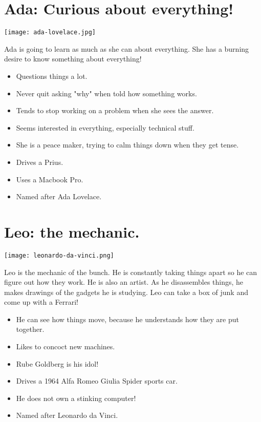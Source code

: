 \section{Ada:  Curious about everything!}
\texttt{[image: ada-lovelace.jpg]}

Ada is going to learn as much as she can about everything. She has a burning
desire to know something about everything!

\begin{itemize}
    \item{Questions things a lot.}
    \item{Never quit asking "why" when told how something works.}
    \item{Tends to stop working on a problem when she sees the answer.}
    \item{Seems interested in everything, especially technical stuff.}
    \item{She is a peace maker, trying to calm things down when they get tense.}
    \item{Drives a Prius.}
    \item{Uses a Macbook Pro.}
    \item{Named after Ada Lovelace.}
\end{itemize}


\section{Leo: the mechanic.}

\texttt{[image: leonardo-da-vinci.png]}

Leo is the mechanic of the bunch. He is constantly taking things apart so he
can figure out how they work. He is also an artist. As he disassembles things,
he makes drawings of the gadgets he is studying. Leo can take a box of junk and
come up with a Ferrari!

\begin{itemize}
    \item{He can see how things move, because he understands how they are put together.}
    \item{Likes to concoct new machines.}
    \item{Rube Goldberg is his idol!}
    \item{Drives a 1964 Alfa Romeo Giulia Spider sports car.}
    \item{He does not own a stinking computer!}
    \item{Named after Leonardo da Vinci.}
\end{itemize}

